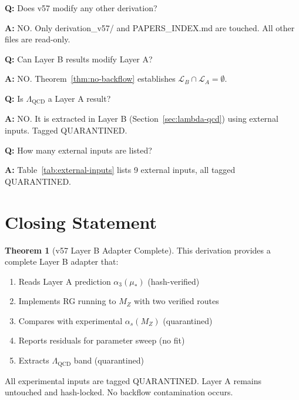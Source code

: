\documentclass[11pt,a4paper]{article}
\theoremstyle{definition}
\newtheorem{theorem}{Theorem}[section]
\begin{document}
\begin{trapbox}
\textbf{Q:} Does v57 modify any other derivation?

\textbf{A:} NO. Only derivation\_v57/ and PAPERS\_INDEX.md are touched.
All other files are read-only.
\end{trapbox}

\begin{trapbox}
\textbf{Q:} Can Layer B results modify Layer A?

\textbf{A:} NO. Theorem~\ref{thm:no-backflow} establishes $\mathcal{L}_B \cap \mathcal{L}_A = \emptyset$.
\end{trapbox}

\begin{trapbox}
\textbf{Q:} Is $\Lambda_{\text{QCD}}$ a Layer A result?

\textbf{A:} NO. It is extracted in Layer B (Section~\ref{sec:lambda-qcd})
using external inputs. Tagged QUARANTINED.
\end{trapbox}

\begin{trapbox}
\textbf{Q:} How many external inputs are listed?

\textbf{A:} Table~\ref{tab:external-inputs} lists 9 external inputs,
all tagged QUARANTINED.
\end{trapbox}

\section{Closing Statement}
\label{sec:closing}

\begin{theorem}[v57 Layer B Adapter Complete]
\label{thm:v57-complete}
This derivation provides a complete Layer B adapter that:
\begin{enumerate}
  \item Reads Layer A prediction $\alpha_3(\mu_*)$ (hash-verified)
  \item Implements RG running to $M_Z$ with two verified routes
  \item Compares with experimental $\alpha_s(M_Z)$ (quarantined)
  \item Reports residuals for parameter sweep (no fit)
  \item Extracts $\Lambda_{\text{QCD}}$ band (quarantined)
\end{enumerate}

All experimental inputs are tagged QUARANTINED.
Layer A remains untouched and hash-locked.
No backflow contamination occurs.
\end{theorem}
\end{document}
